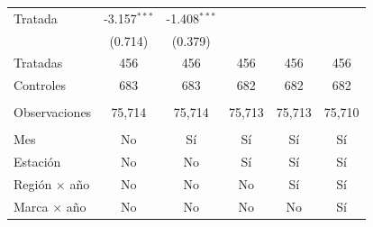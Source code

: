 \begin{tabular}{lccccc}
   Tratada              & -3.157$^{***}$ & -1.408$^{***}$ &                &                &   \\   
                        & (0.714)        & (0.379)        &                &                &   \\   
   Tratadas             & 456            & 456            & 456            & 456            & 456\\  
   Controles            & 683            & 683            & 682            & 682            & 682\\  
    \\
   Observaciones        & 75,714         & 75,714         & 75,713         & 75,713         & 75,710\\  
    \\
   Mes                  & No             & Sí             & Sí             & Sí             & Sí\\  
   Estación             & No             & No             & Sí             & Sí             & Sí\\  
   Región $\times$ año  & No             & No             & No             & Sí             & Sí\\  
   Marca $\times$ año   & No             & No             & No             & No             & Sí\\  
   \bottomrule
\end{tabular}
\par\endgroup


